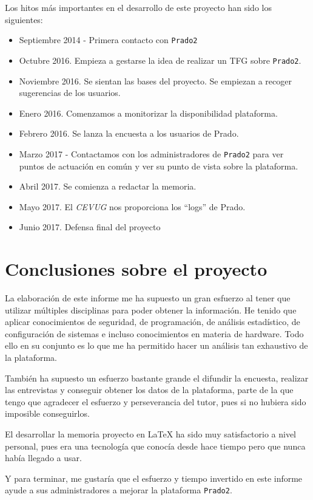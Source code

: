 Los hitos más importantes en el desarrollo de este proyecto han sido los siguientes:

\begin{itemize}
	\item Septiembre 2014 - Primera contacto con \texttt{Prado2}

    \item Octubre 2016. Empieza a gestarse la idea de realizar un TFG sobre \texttt{Prado2}.

    \item Noviembre 2016. Se sientan las bases del proyecto. Se empiezan a recoger sugerencias de los usuarios.

    \item Enero 2016. Comenzamos a monitorizar la disponibilidad plataforma.

    \item Febrero 2016. Se lanza la encuesta a los usuarios de Prado.

    \item Marzo 2017 - Contactamos con los administradores de \texttt{Prado2} para ver puntos de actuación en común y ver su punto de vista sobre la plataforma.

    \item Abril 2017. Se comienza a redactar la memoria.

    \item Mayo 2017. El \textit{CEVUG} nos proporciona los ``logs'' de Prado.

    \item Junio 2017. Defensa final del proyecto

\end{itemize}

\section{Conclusiones sobre el proyecto}

La elaboración de este informe me ha supuesto un gran esfuerzo al tener que utilizar múltiples disciplinas para poder obtener la información. He tenido que aplicar conocimientos de seguridad, de programación, de análisis estadístico, de configuración de sistemas e incluso conocimientos en materia de hardware. Todo ello en su conjunto es lo que me ha permitido hacer un análisis tan exhaustivo de la plataforma.

\bigskip
También ha supuesto un esfuerzo bastante grande el difundir la encuesta, realizar las entrevistas y conseguir obtener los datos de la plataforma, parte de la que tengo que agradecer el esfuerzo y perseverancia del tutor, pues si no hubiera sido imposible conseguirlos.

\bigskip
El desarrollar la memoria proyecto en LaTeX ha sido muy satisfactorio a nivel personal, pues era una tecnología que conocía desde hace tiempo pero que nunca había llegado a usar.

\bigskip
Y para terminar, me gustaría que el esfuerzo y tiempo invertido en este informe ayude a sus administradores a mejorar la plataforma \texttt{Prado2}.


